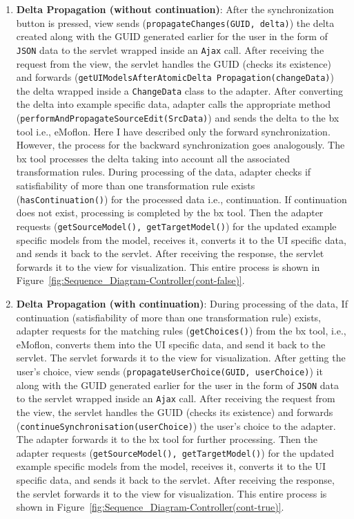\begin{enumerate}
	\item {\textbf{Delta Propagation (without continuation)}: After the synchronization button is pressed, view sends (\texttt{propagateChanges(GUID, delta)}) the delta created along with the GUID generated earlier for the user in the form of \texttt{JSON} data to the servlet wrapped inside an \texttt{Ajax} call. After receiving the request from the view, the servlet handles the GUID (checks its existence) and forwards (\texttt{getUIModelsAfterAtomicDelta Propagation(changeData)}) the delta wrapped inside a \texttt{ChangeData} class to the adapter. After converting the delta into example specific data, adapter calls the appropriate method (\texttt{performAndPropagateSourceEdit(SrcData)}) and sends the delta to the bx tool i.e., eMoflon. Here I have described only the forward synchronization. However, the process for the backward synchronization goes analogously. The bx tool processes the delta taking into account all the associated transformation rules. During processing of the data, adapter checks if satisfiability of more than one transformation rule exists (\texttt{hasContinuation()}) for the processed data i.e., continuation. If continuation does not exist, processing is completed by the bx tool. Then the adapter requests (\texttt{getSourceModel(), getTargetModel()}) for the updated example specific models from the model, receives it, converts it to the UI specific data, and sends it back to the servlet. After receiving the response, the servlet forwards it to the view for visualization. This entire process is shown in Figure~\ref{fig:Sequence_Diagram-Controller(cont-false)}.}
	
	\item {\textbf{Delta Propagation (with continuation)}: During processing of the data, If continuation (satisfiability of more than one transformation rule) exists, adapter requests for the matching rules (\texttt{getChoices()}) from the bx tool, i.e., eMoflon, converts them into the UI specific data, and send it back to the servlet. The servlet forwards it to the view for visualization. After getting the user's choice, view sends (\texttt{propagateUserChoice(GUID, userChoice)}) it along with the GUID generated earlier for the user in the form of \texttt{JSON} data to the servlet wrapped inside an \texttt{Ajax} call. After receiving the request from the view, the servlet handles the GUID (checks its existence) and forwards (\texttt{continueSynchronisation(userChoice)}) the user's choice to the adapter. The adapter forwards it to the bx tool for further processing. Then the adapter requests (\texttt{getSourceModel(), getTargetModel()}) for the updated example specific models from the model, receives it, converts it to the UI specific data, and sends it back to the servlet. After receiving the response, the servlet forwards it to the view for visualization. This entire process is shown in Figure~\ref{fig:Sequence_Diagram-Controller(cont-true)}.}
\end{enumerate}

